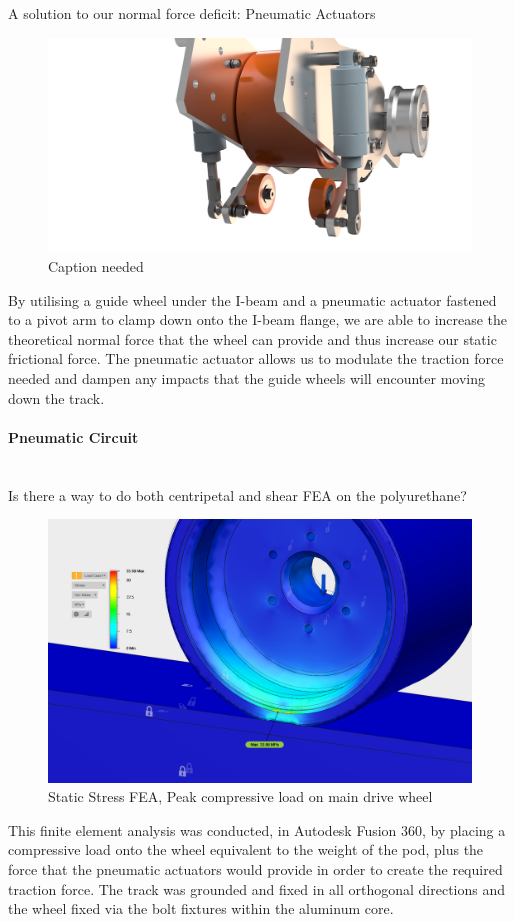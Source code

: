 \documentclass{report}
\let\oldparagraph\paragraph
\renewcommand{\paragraph}[1]{\oldparagraph{#1}\mbox{}\\}
\begin{document}
    A solution to our normal force deficit: Pneumatic Actuators
    \begin{figure}[H]
        \centering
        \includegraphics[width=\linewidth]{images/fig20}
        \caption{Caption needed}
    \end{figure}
    By utilising a guide wheel under the I-beam and a pneumatic actuator fastened to a pivot arm to clamp down onto the I-beam flange, we are able to increase the theoretical normal force that the wheel can provide and thus increase our static frictional force. The pneumatic actuator allows us to modulate the traction force needed and dampen any impacts that the guide wheels will encounter moving down the track.
    
    \paragraph{Pneumatic Circuit}
    Is there a way to do both centripetal and shear FEA on the polyurethane?\\
    \begin{figure}[H]
        \centering
        \includegraphics[width=\linewidth]{images/fig21}
        \caption{Static Stress FEA, Peak compressive load on main drive wheel}
    \end{figure}
    This finite element analysis was conducted, in Autodesk Fusion 360, by placing a compressive load onto the wheel equivalent to the weight of the pod, plus the force that the pneumatic actuators would provide in order to create the required traction force. The track was grounded and fixed in all orthogonal directions and the wheel fixed via the bolt fixtures within the aluminum core.\\
    
\end{document}
